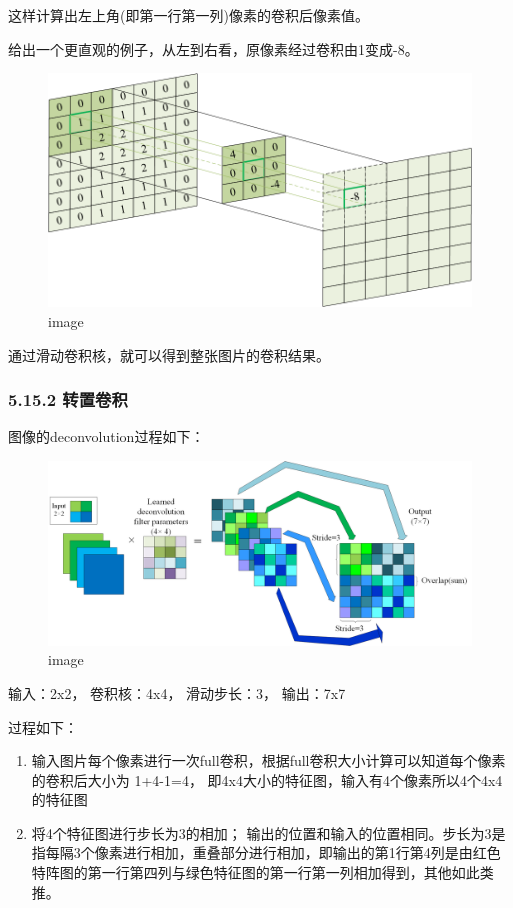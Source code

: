这样计算出左上角(即第一行第一列)像素的卷积后像素值。

给出一个更直观的例子，从左到右看，原像素经过卷积由1变成-8。

\begin{figure}
\centering
\includegraphics{./img/ch5/5.19.1-3.png}
\caption{image}
\end{figure}

通过滑动卷积核，就可以得到整张图片的卷积结果。

\subsubsection{5.15.2 转置卷积}\label{ux8f6cux7f6eux5377ux79ef}

图像的deconvolution过程如下：

\begin{figure}
\centering
\includegraphics{./img/ch5/5.19.2-5.png}
\caption{image}
\end{figure}

输入：2x2， 卷积核：4x4， 滑动步长：3， 输出：7x7

过程如下：

\begin{enumerate}
\def\labelenumi{\arabic{enumi}.}
\item
  输入图片每个像素进行一次full卷积，根据full卷积大小计算可以知道每个像素的卷积后大小为
  1+4-1=4， 即4x4大小的特征图，输入有4个像素所以4个4x4的特征图
\item
  将4个特征图进行步长为3的相加；
  输出的位置和输入的位置相同。步长为3是指每隔3个像素进行相加，重叠部分进行相加，即输出的第1行第4列是由红色特阵图的第一行第四列与绿色特征图的第一行第一列相加得到，其他如此类推。
\end{enumerate}

